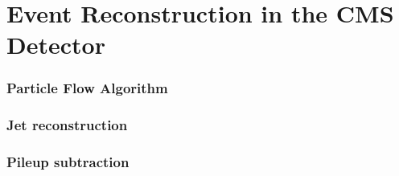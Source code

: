 \chapter{Event Reconstruction in the CMS Detector}
\label{sec:EventReconstruction}

\subsection{Particle Flow Algorithm}
\label{sec:ParticleFlow}

\subsection{Jet reconstruction}
\label{sec:Jet}

\subsection{Pileup subtraction}
\label{}

